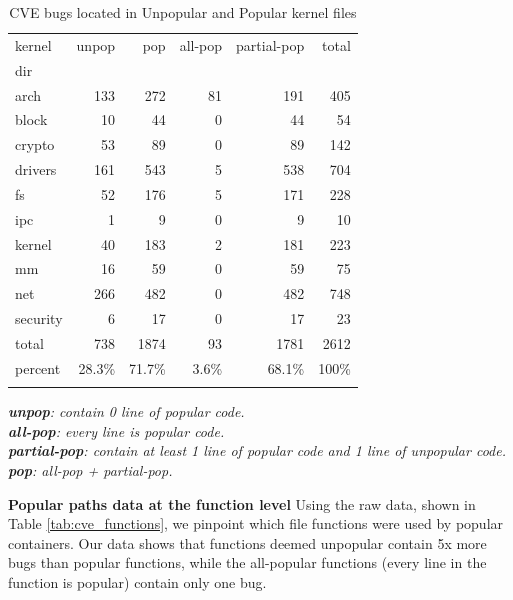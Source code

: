 \begin{table}
\caption{CVE bugs located in Unpopular and Popular kernel files}
\label{tab:cve_files}
\begin{tabular}{l|r|r|r|r|r}
 kernel & unpop & pop & all-pop & partial-pop & total \\
 dir & \color{red}{(CVEs)} & \color{red}{(CVEs)} & \color{red}{(CVEs)} & \color{red}{(CVEs)} & \\
 \hline
 arch & 133\color{red}{(3)} & 272\color{red}{(1)} & 81 & 191\color{red}{(1)} & 405 \\
 \hline
 block & 10 & 44 & 0 & 44 & 54 \\
 \hline
 crypto & 53\color{red}{(1)} & 89\color{red}{(2)} & 0 & 89\color{red}{(2)} & 142 \\
 \hline
 drivers & 161\color{red}{(11)} & 543\color{red}{(3)} & 5 & 538\color{red}{(3)} & 704 \\
 \hline
 fs & 52\color{red}{(6)} & 176\color{red}{(2)} & 5 & 171\color{red}{(2)} & 228 \\
 \hline
 ipc & 1 & 9 & 0 & 9 & 10 \\
 \hline
 kernel & 40\color{red}{(2)} & 183 & 2 & 181 & 223 \\
 \hline
 mm & 16\color{red}{(1)} & 59\color{red}{(4)} & 0 & 59\color{red}{(4)} & 75 \\
 \hline
 net & 266\color{red}{(5)} & 482\color{red}{(3)} & 0 & 482\color{red}{(3)} & 748 \\
 \hline
 security & 6 & 17 & 0 & 17 & 23 \\
 \hline
 total & 738\color{red}{(29)} & 1874\color{red}{(15)} & 93 & 1781\color{red}{(15)} & 2612 \\
 \hline 
 percent & 28.3\% & 71.7\% & 3.6\% & 68.1\% & 100\% \\
 & \color{red}{(66\%)} & \color{red}{(34\%)} & \color{red}{(0\%)} & \color{red}{(34\%)} &
\end{tabular}
\textit{\textbf{unpop}: contain 0 line of popular code.} \\
\textit{\textbf{all-pop}: every line is popular code.} \\
\textit{\textbf{partial-pop}: contain at least 1 line of popular code and 1 line of unpopular code.} \\
\textit{\textbf{pop}: all-pop + partial-pop.}
\end{table}

\noindent
\textbf{Popular paths data at the function level}
\newline
Using the raw data, shown in Table \ref{tab:cve_functions}, we pinpoint which file functions were used by popular containers. 
Our data shows that functions deemed unpopular contain 5x more bugs than popular functions, 
while the all-popular functions (every line in the function is  popular) contain only one bug. 

